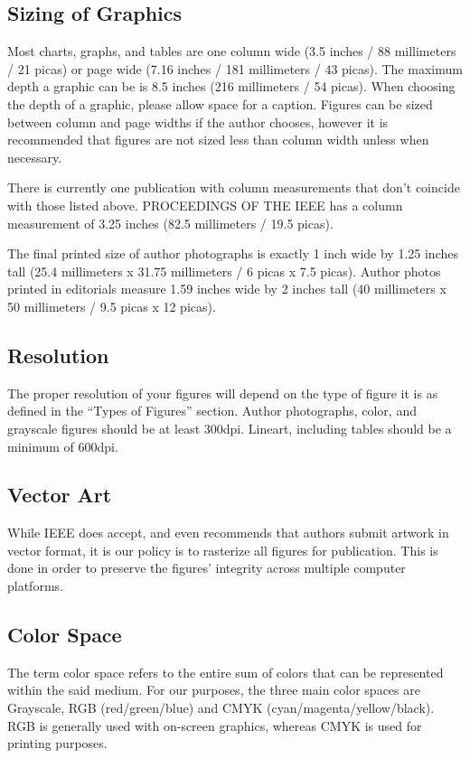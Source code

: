 \documentclass[journal]{IEEEtranTICPS}
\begin{document}
\subsection{Sizing of Graphics}

Most charts, graphs, and tables are one column wide (3.5 inches / 88 millimeters / 21 picas) or page wide (7.16 inches / 181 millimeters / 43 picas). The maximum depth a graphic can be is 8.5 inches (216 millimeters / 54 picas). When choosing the depth of a graphic, please allow space for a caption. Figures can be sized between column and page widths if the author chooses, however it is recommended that figures are not sized less than column width unless when necessary.

There is currently one publication with column measurements that don't coincide with those listed above. PROCEEDINGS OF THE IEEE has a column measurement of 3.25 inches (82.5 millimeters / 19.5 picas).

The final printed size of author photographs is exactly
1 inch wide by 1.25 inches tall (25.4 millimeters x 31.75 millimeters / 6 picas x 7.5 picas). Author photos printed in editorials measure 1.59 inches wide by 2 inches tall (40 millimeters  x 50 millimeters  / 9.5 picas x 12 picas).


\subsection{Resolution}

The proper resolution of your figures will depend on the type of figure it is as defined in the ``Types of Figures'' section. Author photographs, color, and grayscale figures should be at least 300dpi. Lineart, including tables should be a minimum of 600dpi.


\subsection{Vector Art}

While IEEE does accept, and even recommends that authors submit artwork in vector format, it is our policy is to rasterize all figures for publication. This is done in order to preserve the figures' integrity across multiple computer platforms.


\subsection{Color Space}

The term color space refers to the entire sum of colors that can be represented within the said medium. For our purposes, the three main color spaces are Grayscale, RGB (red/green/blue) and CMYK (cyan/magenta/yellow/black). RGB is generally used with on-screen graphics, whereas CMYK is used for printing purposes.
\end{document}
